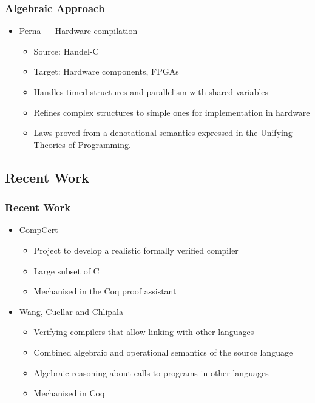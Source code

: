 \documentclass{beamer}
\newcommand{\footmake}[1]{
\ifthenelse{\equal{#1}{}}%
	{}%
	{\footnotetext{#1}}%
}
\newenvironment{slide}[2][fragile,environment=slide]
{\begin{frame}[#1]
	\frametitle{#2}\begin{refsegment}}
{\footmake{\printbibliography[segment=\therefsegment]}\end{refsegment}\end{frame}}
\begin{document}
\begin{slide}{Algebraic Approach}
  \begin{itemize}
  \item Perna\cite{perna2010, perna2011} --- Hardware compilation
    \begin{itemize}
    \item Source: Handel-C
    \item Target: Hardware components, FPGAs
    \item Handles timed structures and parallelism with shared variables
    \item Refines complex structures to simple ones for implementation in hardware
    \item Laws proved from a denotational semantics expressed in the Unifying Theories of Programming\cite{hoare1998}.
    \end{itemize}
  \end{itemize}
\end{slide}

\subsection{Recent Work}

\begin{slide}{Recent Work}
  \begin{itemize}
  \item CompCert\cite{leroy2012}
    \begin{itemize}
    \item Project to develop a realistic formally verified compiler
    \item Large subset of C
    \item Mechanised in the Coq proof assistant
    \end{itemize}
  \item Wang, Cuellar and Chlipala\cite{wang2014}
    \begin{itemize}
    \item Verifying compilers that allow linking with other languages
    \item Combined algebraic and operational semantics of the source language
    \item Algebraic reasoning about calls to programs in other languages
    \item Mechanised in Coq 
    \end{itemize}
  \end{itemize}
\end{slide}
\end{document}
